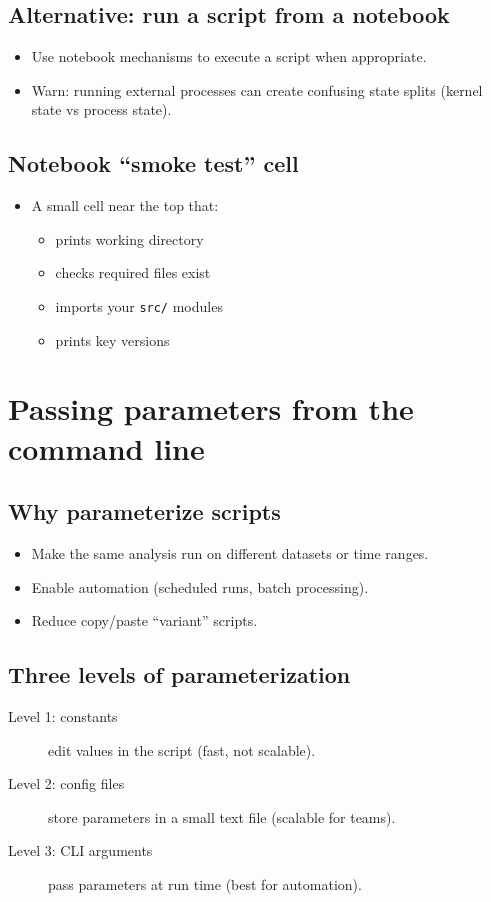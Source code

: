 \subsection{Alternative: run a script from a notebook}
\begin{itemize}
\item Use notebook mechanisms to execute a script when appropriate.
\item Warn: running external processes can create confusing state splits (kernel state vs process state).
\end{itemize}

\subsection{Notebook ``smoke test'' cell}
\begin{itemize}
\item A small cell near the top that:
\begin{itemize}
\item prints working directory
\item checks required files exist
\item imports your \texttt{src/} modules
\item prints key versions
\end{itemize}
\end{itemize}

\section{Passing parameters from the command line}
\subsection{Why parameterize scripts}
\begin{itemize}
\item Make the same analysis run on different datasets or time ranges.
\item Enable automation (scheduled runs, batch processing).
\item Reduce copy/paste ``variant'' scripts.
\end{itemize}

\subsection{Three levels of parameterization}
\begin{description}
\item[Level 1: constants] edit values in the script (fast, not scalable).
\item[Level 2: config files] store parameters in a small text file (scalable for teams).
\item[Level 3: CLI arguments] pass parameters at run time (best for automation).
\end{description}

